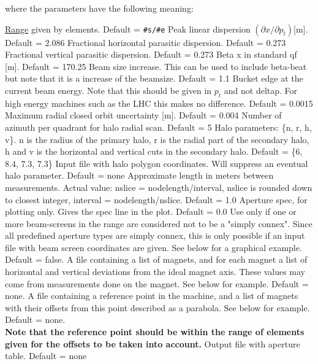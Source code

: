 where the parameters have the following meaning: 
\begin{madlist}
	 \hyperref[sec:range]{Range} given by
	elements. Default = \texttt{\#s/\#e}  
	 Peak linear dispersion $(\partial x / \partial p_t)$[m]. Default = 2.086 
	 Fractional horizontal parasitic dispersion. Default = 0.273 
	 Fractional vertical parasitic dispersion. Default = 0.273 
	 Beta x in standard qf [m]. Default = 170.25 
	 Beam size increase. This can be used to include beta-beat but note that it is a increase of the beamsize.  Default = 1.1 
	 Bucket edge at the current beam energy. Note that this should be given in $p_t$ and not deltap. For high energy machines such as the LHC this makes no difference. Default = 0.0015 
	 Maximum radial closed orbit uncertainty [m]. Default = 0.004 
	 Number of azimuth per quadrant for halo radial scan. Default = 5 
	 Halo parameters: \{n, r, h, v\}. n is the radius of the
	primary halo,  r is the radial part of the secondary halo, h and v
	is the horizontal and  vertical cuts in the secondary halo. Default
	= \{6, 8.4, 7.3, 7.3\}  
	 Input file with halo polygon coordinates. Will
	suppress  an eventual halo parameter. Default = none  
	 Approximate length in meters between
	measurements. Actual value:  nslice = nodelength/interval, nslice
	is rounded down to closest integer,  interval =
	nodelength/nslice. Default = 1.0  
	 Aperture spec, for plotting only. Gives the spec line in
	the plot. Default = 0.0  
	 Use only if one or more beam-screens in the range are
	considered not to  be a "simply connex". Since all predefined \madx aperture 
	types are simply connex, this is only possible  if an input file with
	beam screen coordinates are given. See below for a graphical
	example. Default = false.  
	 A file containing a list of magnets, and for each
	magnet a list of horizontal and vertical deviations from the ideal
	magnet axis. These values may come from measurements done on the
	magnet. See below for example. Default = none.  
	 A file containing a reference point in the machine,
	and a list of magnets with their offsets from this point described
	as a parabola. See below for example. Default = none. \\
	\textbf{Note that the reference point should be within the range of
	elements given for the offsets to be taken into account.}
	 Output file with aperture table. Default = none 
\end{madlist}

